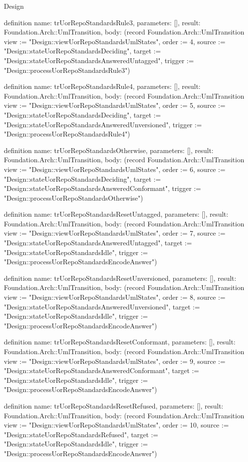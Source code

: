\begin{lexlean}{Design}
\begin{semanticmodule}
definition{
  name: trUorRepoStandardsRule3,
  parameters: [],
  result: Foundation.Arch::UmlTransition,
  body: (record Foundation.Arch::UmlTransition {view := "Design::viewUorRepoStandardsUmlStates", order := 4, source := "Design::stateUorRepoStandardsDeciding", target := "Design::stateUorRepoStandardsAnsweredUntagged", trigger := "Design::processUorRepoStandardsRule3"})
}

definition{
  name: trUorRepoStandardsRule4,
  parameters: [],
  result: Foundation.Arch::UmlTransition,
  body: (record Foundation.Arch::UmlTransition {view := "Design::viewUorRepoStandardsUmlStates", order := 5, source := "Design::stateUorRepoStandardsDeciding", target := "Design::stateUorRepoStandardsAnsweredUnversioned", trigger := "Design::processUorRepoStandardsRule4"})
}

definition{
  name: trUorRepoStandardsOtherwise,
  parameters: [],
  result: Foundation.Arch::UmlTransition,
  body: (record Foundation.Arch::UmlTransition {view := "Design::viewUorRepoStandardsUmlStates", order := 6, source := "Design::stateUorRepoStandardsDeciding", target := "Design::stateUorRepoStandardsAnsweredConformant", trigger := "Design::processUorRepoStandardsOtherwise"})
}

definition{
  name: trUorRepoStandardsResetUntagged,
  parameters: [],
  result: Foundation.Arch::UmlTransition,
  body: (record Foundation.Arch::UmlTransition {view := "Design::viewUorRepoStandardsUmlStates", order := 7, source := "Design::stateUorRepoStandardsAnsweredUntagged", target := "Design::stateUorRepoStandardsIdle", trigger := "Design::processUorRepoStandardsEncodeAnswer"})
}

definition{
  name: trUorRepoStandardsResetUnversioned,
  parameters: [],
  result: Foundation.Arch::UmlTransition,
  body: (record Foundation.Arch::UmlTransition {view := "Design::viewUorRepoStandardsUmlStates", order := 8, source := "Design::stateUorRepoStandardsAnsweredUnversioned", target := "Design::stateUorRepoStandardsIdle", trigger := "Design::processUorRepoStandardsEncodeAnswer"})
}

definition{
  name: trUorRepoStandardsResetConformant,
  parameters: [],
  result: Foundation.Arch::UmlTransition,
  body: (record Foundation.Arch::UmlTransition {view := "Design::viewUorRepoStandardsUmlStates", order := 9, source := "Design::stateUorRepoStandardsAnsweredConformant", target := "Design::stateUorRepoStandardsIdle", trigger := "Design::processUorRepoStandardsEncodeAnswer"})
}

definition{
  name: trUorRepoStandardsResetRefused,
  parameters: [],
  result: Foundation.Arch::UmlTransition,
  body: (record Foundation.Arch::UmlTransition {view := "Design::viewUorRepoStandardsUmlStates", order := 10, source := "Design::stateUorRepoStandardsRefused", target := "Design::stateUorRepoStandardsIdle", trigger := "Design::processUorRepoStandardsEncodeAnswer"})
}


\end{semanticmodule}
\end{lexlean}
